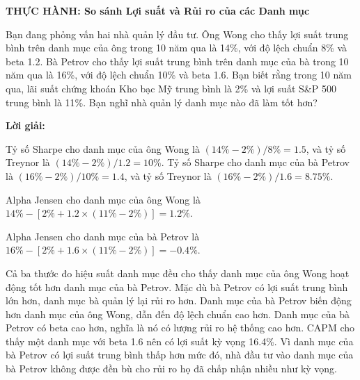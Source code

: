 \begin{framed}
\textbf{THỰC HÀNH: So sánh Lợi suất và Rủi ro của các Danh mục}

Bạn đang phỏng vấn hai nhà quản lý đầu tư. Ông Wong cho thấy lợi suất trung bình trên danh mục của ông trong 10 năm qua là 14\%, với độ lệch chuẩn 8\% và beta 1.2. Bà Petrov cho thấy lợi suất trung bình trên danh mục của bà trong 10 năm qua là 16\%, với độ lệch chuẩn 10\% và beta 1.6. Bạn biết rằng trong 10 năm qua, lãi suất chứng khoán Kho bạc Mỹ trung bình là 2\% và lợi suất S\&P 500 trung bình là 11\%. Bạn nghĩ nhà quản lý danh mục nào đã làm tốt hơn?

\textbf{Lời giải:}

Tỷ số Sharpe cho danh mục của ông Wong là $(14\%-2\%)/8\% = 1.5$, và tỷ số Treynor là $(14\%-2\%)/1.2 = 10\%$. Tỷ số Sharpe cho danh mục của bà Petrov là $(16\%-2\%)/10\% = 1.4$, và tỷ số Treynor là $(16\%-2\%)/1.6 = 8.75\%$.

Alpha Jensen cho danh mục của ông Wong là $14\% - [2\% + 1.2\times(11\%-2\%)] = 1.2\%$.

Alpha Jensen cho danh mục của bà Petrov là $16\% - [2\% + 1.6\times(11\%-2\%)] = -0.4\%$.

Cả ba thước đo hiệu suất danh mục đều cho thấy danh mục của ông Wong hoạt động tốt hơn danh mục của bà Petrov. Mặc dù bà Petrov có lợi suất trung bình lớn hơn, danh mục bà quản lý lại rủi ro hơn. Danh mục của bà Petrov biến động hơn danh mục của ông Wong, dẫn đến độ lệch chuẩn cao hơn. Danh mục của bà Petrov có beta cao hơn, nghĩa là nó có lượng rủi ro hệ thống cao hơn. CAPM cho thấy một danh mục với beta 1.6 nên có lợi suất kỳ vọng 16.4\%. Vì danh mục của bà Petrov có lợi suất trung bình thấp hơn mức đó, nhà đầu tư vào danh mục của bà Petrov không được đền bù cho rủi ro họ đã chấp nhận nhiều như kỳ vọng.
\end{framed}
